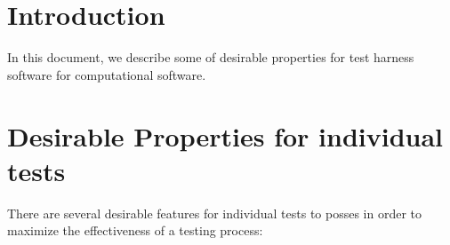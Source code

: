 \documentclass[pdf,ps2pdf,11pt]{SANDreport}
\begin{document}

%


\SANDmain %


%
{}\section{Introduction}
%

In this document, we describe some of desirable properties for test
harness software for computational software.


%
{}\section{Desirable Properties for individual tests}
%

There are several desirable features for individual tests to posses in
order to maximize the effectiveness of a testing process:
\end{document}
